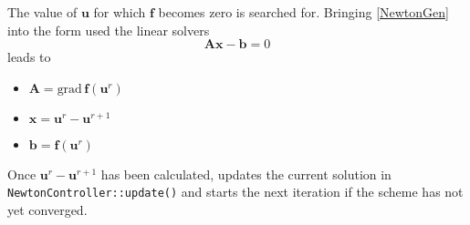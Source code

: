 The value of $\textbf{u}$ for which $\textbf{f}$ becomes zero is
searched for. Bringing \eqref{NewtonGen} into the form used the linear
solvers
\begin{equation}
\label{GenSysEq}
 \textbf{A}\textbf{x} - \textbf{b} = 0
\end{equation}
leads to
\begin{itemize}
\item $\textbf{A} = \text{grad}\,\textbf{f} (\textbf{u}^r)$
\item $\textbf{x} = \textbf{u}^{r} - \textbf{u}^{r+1}$
\item $\textbf{b} = \textbf{f}(\textbf{u}^{r})$
\end{itemize}

Once $\textbf{u}^{r} - \textbf{u}^{r+1}$ has been calculated, \eWoms
updates the current solution in \texttt{NewtonController::update()}
and starts the next iteration if the scheme has not yet converged.

